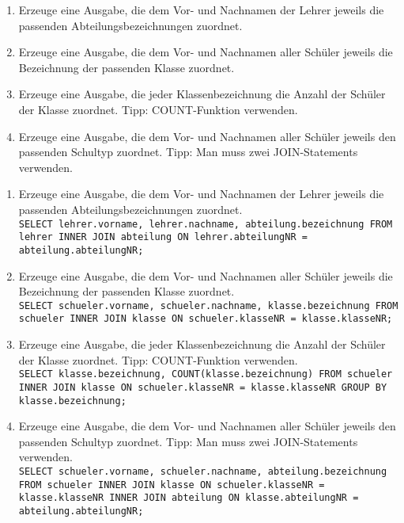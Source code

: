 \begin{Exercise}[title={Bearbeite folgende Aufgaben}, label=Join]
	\begin{enumerate}
		\item Erzeuge eine Ausgabe, die dem Vor- und Nachnamen der Lehrer jeweils die passenden Abteilungsbezeichnungen zuordnet.
		\item Erzeuge eine Ausgabe, die dem Vor- und Nachnamen aller Schüler jeweils die Bezeichnung der passenden Klasse zuordnet.
		\item Erzeuge eine Ausgabe, die jeder Klassenbezeichnung die Anzahl der Schüler der Klasse zuordnet. Tipp: COUNT-Funktion verwenden.
		\item Erzeuge eine Ausgabe, die dem Vor- und Nachnamen aller Schüler jeweils den passenden Schultyp zuordnet. Tipp: Man muss zwei JOIN-Statements verwenden.
	\end{enumerate}
\end{Exercise}
\begin{Answer}[ref=Join]
	\begin{enumerate}
		\item Erzeuge eine Ausgabe, die dem Vor- und Nachnamen der Lehrer jeweils die passenden Abteilungsbezeichnungen zuordnet.\\
		\lstinline!SELECT lehrer.vorname, lehrer.nachname, abteilung.bezeichnung FROM lehrer INNER JOIN abteilung ON lehrer.abteilungNR = abteilung.abteilungNR;!
		\item Erzeuge eine Ausgabe, die dem Vor- und Nachnamen aller Schüler jeweils die Bezeichnung der passenden Klasse zuordnet.\\
		\lstinline!SELECT schueler.vorname, schueler.nachname, klasse.bezeichnung FROM schueler INNER JOIN klasse ON schueler.klasseNR = klasse.klasseNR;!
		\item Erzeuge eine Ausgabe, die jeder Klassenbezeichnung die Anzahl der Schüler der Klasse zuordnet. Tipp: COUNT-Funktion verwenden.\\
		\lstinline!SELECT klasse.bezeichnung, COUNT(klasse.bezeichnung) FROM schueler INNER JOIN klasse ON schueler.klasseNR = klasse.klasseNR GROUP BY klasse.bezeichnung;!
		\item Erzeuge eine Ausgabe, die dem Vor- und Nachnamen aller Schüler jeweils den passenden Schultyp zuordnet. Tipp: Man muss zwei JOIN-Statements verwenden.\\
		\lstinline!SELECT schueler.vorname, schueler.nachname, abteilung.bezeichnung FROM schueler INNER JOIN klasse ON schueler.klasseNR = klasse.klasseNR INNER JOIN abteilung ON klasse.abteilungNR = abteilung.abteilungNR;!
	\end{enumerate}
\end{Answer}